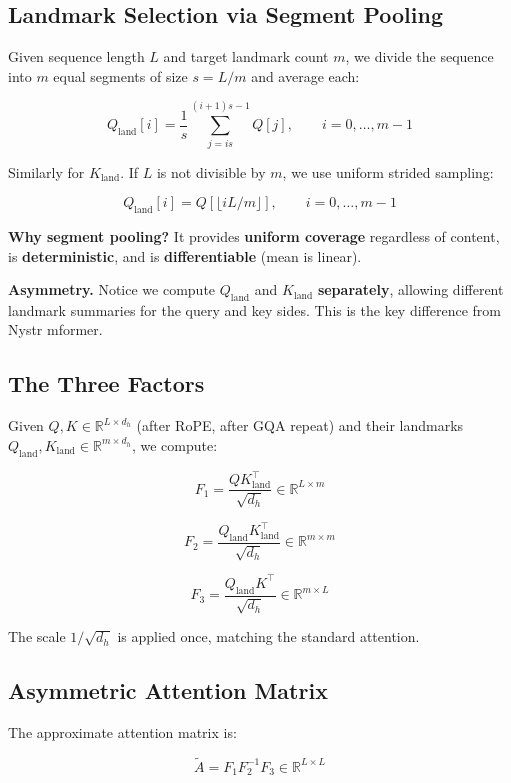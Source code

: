 \subsection{Landmark Selection via Segment Pooling}

Given sequence length $L$ and target landmark count $m$, we divide the 
sequence into $m$ equal segments of size $s = L / m$ and average each:

\[
Q_\text{land}[i] = \frac{1}{s} \sum_{j = i s}^{(i+1) s - 1} Q[j], \qquad i = 0, \ldots, m - 1
\]

Similarly for $K_\text{land}$. If $L$ is not divisible by $m$, we use 
uniform strided sampling:

\[
Q_\text{land}[i] = Q[\lfloor i L / m \rfloor], \qquad i = 0, \ldots, m - 1
\]

\textbf{Why segment pooling?} It provides \textbf{uniform coverage} regardless of 
content, is \textbf{deterministic}, and is \textbf{differentiable} (mean is linear).

\textbf{Asymmetry.} Notice we compute $Q_\text{land}$ and $K_\text{land}$ 
\textbf{separately}, allowing different landmark summaries for the query and 
key sides. This is the key difference from Nystr mformer.

\subsection{The Three Factors}

Given $Q, K \in \mathbb{R}^{L \times d_h}$ (after RoPE, after GQA repeat) and 
their landmarks $Q_\text{land}, K_\text{land} \in \mathbb{R}^{m \times d_h}$, 
we compute:

\[
F_1 = \frac{Q K_\text{land}^\top}{\sqrt{d_h}} \in \mathbb{R}^{L \times m}
\]

\[
F_2 = \frac{Q_\text{land} K_\text{land}^\top}{\sqrt{d_h}} \in \mathbb{R}^{m \times m}
\]

\[
F_3 = \frac{Q_\text{land} K^\top}{\sqrt{d_h}} \in \mathbb{R}^{m \times L}
\]

The scale $1/\sqrt{d_h}$ is applied once, matching the standard attention.

\subsection{Asymmetric Attention Matrix}

The approximate attention matrix is:

\[
\tilde{A} = F_1 F_2^{-1} F_3 \in \mathbb{R}^{L \times L}
\]

